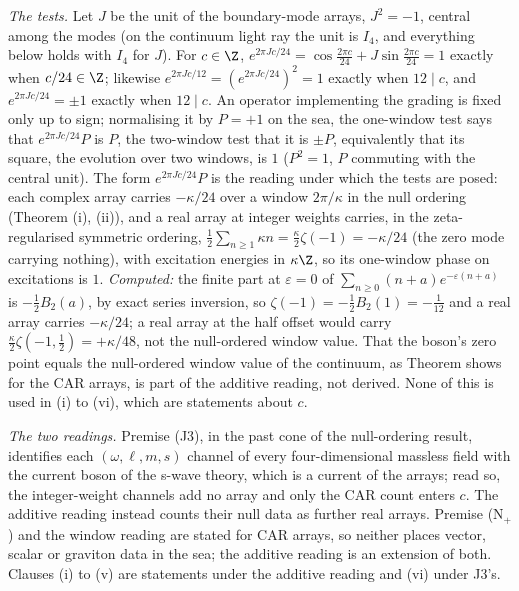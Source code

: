 \emph{The tests.} Let $J$ be the unit of the boundary-mode arrays, $J^{2} = -1$, central among the modes (on the continuum light ray the unit is $I_{4}$, and everything below holds with $I_{4}$ for $J$). For $c \in \Z$, $e^{2\pi Jc/24} = \cos\tfrac{2\pi c}{24} + J\sin\tfrac{2\pi c}{24} = 1$ exactly when $c/24 \in \Z$; likewise $e^{2\pi Jc/12} = (e^{2\pi Jc/24})^{2} = 1$ exactly when $12 \mid c$, and $e^{2\pi Jc/24} = \pm1$ exactly when $12 \mid c$. An operator implementing the grading is fixed only up to sign; normalising it by $P = +1$ on the sea, the one-window test says that $e^{2\pi Jc/24}P$ is $P$, the two-window test that it is $\pm P$, equivalently that its square, the evolution over two windows, is $1$ ($P^{2} = 1$, $P$ commuting with the central unit). The form $e^{2\pi Jc/24}P$ is the reading under which the tests are posed: each complex array carries $-\kappa/24$ over a window $2\pi/\kappa$ in the null ordering (Theorem (i), (ii)), and a real array at integer weights carries, in the zeta-regularised symmetric ordering, $\tfrac12\sum_{n \ge 1}\kappa n = \tfrac{\kappa}{2}\zeta(-1) = -\kappa/24$ (the zero mode carrying nothing), with excitation energies in $\kappa\Z$, so its one-window phase on excitations is $1$. \emph{Computed:} the finite part at $\varepsilon = 0$ of $\sum_{n \ge 0}(n + a)e^{-\varepsilon(n + a)}$ is $-\tfrac12B_{2}(a)$, by exact series inversion, so $\zeta(-1) = -\tfrac12B_{2}(1) = -\tfrac1{12}$ and a real array carries $-\kappa/24$; a real array at the half offset would carry $\tfrac{\kappa}{2}\zeta(-1, \tfrac12) = +\kappa/48$, not the null-ordered window value. That the boson's zero point equals the null-ordered window value of the continuum, as Theorem  shows for the CAR arrays, is part of the additive reading, not derived. None of this is used in (i) to (vi), which are statements about $c$.

\emph{The two readings.} Premise  (J3), in the past cone of the null-ordering result, identifies each $(\omega, \ell, m, s)$ channel of every four-dimensional massless field with the current boson of the s-wave theory, which is a current of the arrays; read so, the integer-weight channels add no array and only the CAR count enters $c$. The additive reading instead counts their null data as further real arrays. Premise (N$_{+}$) and the window reading are stated for CAR arrays, so neither places vector, scalar or graviton data in the sea; the additive reading is an extension of both. Clauses (i) to (v) are statements under the additive reading and (vi) under J3's.

